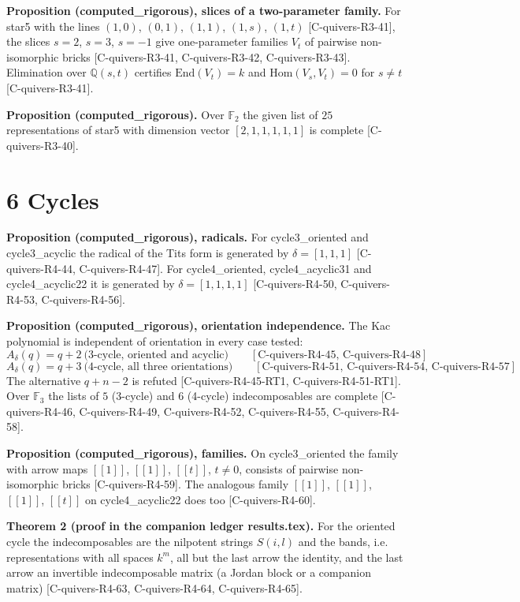 \documentclass[10pt,twocolumn]{article}
\begin{document}
\textbf{Proposition (computed\_rigorous), slices of a two-parameter family.} For star5 with the lines $(1, 0)$, $(0, 1)$, $(1, 1)$, $(1, s)$, $(1, t)$ {\scriptsize[C-quivers-R3-41]}, the slices $s=2$, $s=3$, $s=-1$ give one-parameter families $V_t$ of pairwise non-isomorphic bricks {\scriptsize[C-quivers-R3-41, C-quivers-R3-42, C-quivers-R3-43]}. Elimination over $\mathbb Q(s,t)$ certifies $\mathrm{End}(V_t)=k$ and $\mathrm{Hom}(V_s,V_t)=0$ for $s\ne t$ {\scriptsize[C-quivers-R3-41]}.

\textbf{Proposition (computed\_rigorous).} Over $\mathbb F_2$ the given list of $25$ representations of star5 with dimension vector $[2, 1, 1, 1, 1, 1]$ is complete {\scriptsize[C-quivers-R3-40]}.

\section*{6 Cycles}

\textbf{Proposition (computed\_rigorous), radicals.} For cycle3\_oriented and cycle3\_acyclic the radical of the Tits form is generated by $\delta=[1, 1, 1]$ {\scriptsize[C-quivers-R4-44, C-quivers-R4-47]}. For cycle4\_oriented, cycle4\_acyclic31 and cycle4\_acyclic22 it is generated by $\delta=[1, 1, 1, 1]$ {\scriptsize[C-quivers-R4-50, C-quivers-R4-53, C-quivers-R4-56]}.

\textbf{Proposition (computed\_rigorous), orientation independence.} The Kac polynomial is independent of orientation in every case tested:
$$A_\delta(q)=q+2\ \text{(3-cycle, oriented and acyclic)}\qquad [\text{C-quivers-R4-45, C-quivers-R4-48}]$$
$$A_\delta(q)=q+3\ \text{(4-cycle, all three orientations)}\qquad [\text{C-quivers-R4-51, C-quivers-R4-54, C-quivers-R4-57}]$$
The alternative $q+n-2$ is refuted {\scriptsize[C-quivers-R4-45-RT1, C-quivers-R4-51-RT1]}. Over $\mathbb F_3$ the lists of $5$ (3-cycle) and $6$ (4-cycle) indecomposables are complete {\scriptsize[C-quivers-R4-46, C-quivers-R4-49, C-quivers-R4-52, C-quivers-R4-55, C-quivers-R4-58]}.

\textbf{Proposition (computed\_rigorous), families.} On cycle3\_oriented the family with arrow maps $[[1]]$, $[[1]]$, $[[t]]$, $t\neq0$, consists of pairwise non-isomorphic bricks {\scriptsize[C-quivers-R4-59]}. The analogous family $[[1]]$, $[[1]]$, $[[1]]$, $[[t]]$ on cycle4\_acyclic22 does too {\scriptsize[C-quivers-R4-60]}.

\textbf{Theorem 2 (proof in the companion ledger results.tex).} For the oriented cycle the indecomposables are the nilpotent strings $S(i,l)$ and the bands, i.e. representations with all spaces $k^m$, all but the last arrow the identity, and the last arrow an invertible indecomposable matrix (a Jordan block or a companion matrix) {\scriptsize[C-quivers-R4-63, C-quivers-R4-64, C-quivers-R4-65]}.
\end{document}
